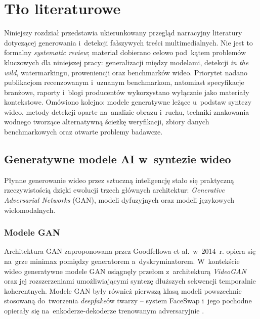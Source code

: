 \chapter{T\l{}o literaturowe}
\label{ch:tlo}

Niniejszy rozdzia\l{} przedstawia ukierunkowany przegl\k{a}d narracyjny literatury
dotycz\k{a}cej generowania i~detekcji fa\l{}szywych tre\'{s}ci multimedialnych.
Nie jest to formalny \textit{systematic review}; materia\l{} dobierano celowo
pod~kątem problemów kluczowych dla niniejszej pracy: generalizacji między modelami,
detekcji \textit{in the wild}, watermarkingu, proweniencji oraz benchmarków wideo.
Priorytet nadano publikacjom recenzowanym i~uznanym benchmarkom, natomiast
specyfikacje branżowe, raporty i~blogi producentów wykorzystano wyłącznie
jako materiały kontekstowe.
Om\'{o}wiono kolejno: modele generatywne leżące u~podstaw syntezy wideo,
metody detekcji oparte na~analizie obrazu i~ruchu, techniki znakowania wodnego
tworzące alternatywną ścieżkę weryfikacji, zbiory danych
benchmarkowych oraz otwarte problemy badawcze.

\section{Generatywne modele AI w~syntezie wideo}
\label{sec:modele_generatywne}

P\l{}ynne generowanie wideo przez sztuczn\k{a} inteligencj\k{e} sta\l{}o si\k{e}
praktyczn\k{a} rzeczywisto\'{s}ci\k{a} dzi\k{e}ki ewolucji trzech g\l{}\'{o}wnych
architektur: \textit{Generative Adversarial Networks} (GAN), modeli dyfuzyjnych
oraz modeli j\k{e}zykowych wielomodalnych.

\subsection{Modele GAN}

Architektura GAN zaproponowana przez Goodfellowa et al.\ w~2014~r.
\cite{Goodfellow2014GAN}
opiera si\k{e} na~grze minimax pomi\k{e}dzy generatorem a~dyskryminatorem.
W~kontekście wideo generatywne modele GAN osi\k{a}gn\k{e}\l{}y prze\l{}om
z~architektur\k{a} \textit{VideoGAN} \cite{Vondrick2016VideoGAN}
oraz jej rozszerzeniami umo\.{z}liwiaj\k{a}cymi syntez\k{e} d\l{}u\.{z}szych sekwencji
temporalnie koherentnych.
Modele GAN by\l{}y r\'{o}wnie\.{z} pierwsz\k{a} klas\k{a} modeli powszechnie stosowan\k{a}
do~tworzenia \textit{deepfake}\'{o}w twarzy -- system FaceSwap i~jego pochodne
opiera\l{}y si\k{e} na~enkoderze-dekoderze trenowanym adversaryjnie
\cite{Khan2025ComprehensiveSurvey}.

